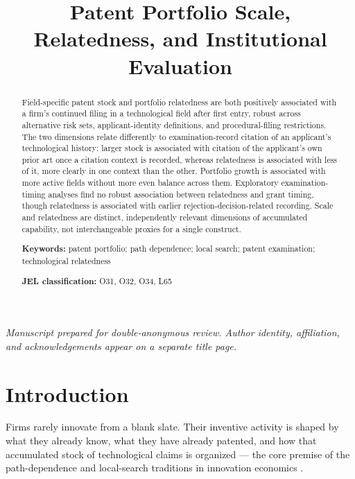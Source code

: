 \documentclass[12pt]{article}
\title{Patent Portfolio Scale, Relatedness, and Institutional Evaluation}
\author{}
\date{}
\begin{document}
\maketitle
\thispagestyle{empty}

\begin{center}
\emph{Manuscript prepared for double-anonymous review. Author identity, affiliation, and acknowledgements appear on a separate title page.}
\end{center}

\begin{abstract}
\noindent Field-specific patent stock and portfolio relatedness are both positively associated with a firm's continued filing in a technological field after first entry, robust across alternative risk sets, applicant-identity definitions, and procedural-filing restrictions. The two dimensions relate differently to examination-record citation of an applicant's technological history: larger stock is associated with citation of the applicant's own prior art once a citation context is recorded, whereas relatedness is associated with less of it, more clearly in one context than the other. Portfolio growth is associated with more active fields without more even balance across them. Exploratory examination-timing analyses find no robust association between relatedness and grant timing, though relatedness is associated with earlier rejection-decision-related recording. Scale and relatedness are distinct, independently relevant dimensions of accumulated capability, not interchangeable proxies for a single construct.

\vspace{8pt}
\noindent \textbf{Keywords:} patent portfolio; path dependence; local search; patent examination; technological relatedness

\vspace{4pt}
\noindent \textbf{JEL classification:} O31, O32, O34, L65
\end{abstract}

\newpage

\section{Introduction}

Firms rarely innovate from a blank slate. Their inventive activity is shaped by what they already know, what they have already patented, and how that accumulated stock of technological claims is organized --- the core premise of the path-dependence and local-search traditions in innovation economics \citep{dosi1982, nelson1982, david1985, sydow2009}.
\end{document}
